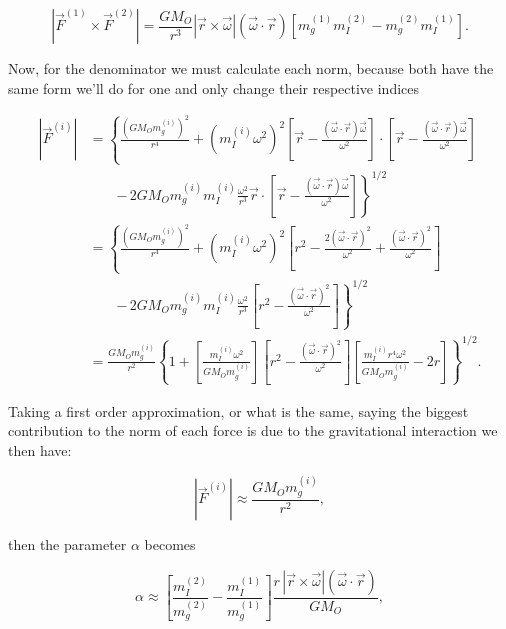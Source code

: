             \begin{equation}
                \left|\Vec{F}^{(1)}\times \Vec{F}^{(2)}\right| = \frac{GM_O}{r^3}|\Vec{r}\times\Vec{\omega}|(\Vec{\omega}\cdot\Vec{r})[m_g^{(1)}m_I^{(2)} - m_g^{(2)}m_I^{(1)}].
            \end{equation}

            Now, for the denominator we must calculate each norm, because both have the same form we'll do for one and only change their respective indices

            \begin{align*}
                |\Vec{F}^{(i)}| &= \left\{\frac{(GM_Om_g^{(i)})^2}{r^4} + (m_I^{(i)}\omega^2)^2 \left[\Vec{r} - \frac{(\Vec{\omega}\cdot\Vec{r})\Vec{\omega}}{\omega^2}\right]\cdot\left[\Vec{r} - \frac{(\Vec{\omega}\cdot\Vec{r})\Vec{\omega}}{\omega^2}\right]\right.\\
                &\qquad\left. -\,2GM_Om_g^{(i)}m_I^{(i)}\frac{\omega^2}{r^3}\Vec{r}\cdot\left[\Vec{r} - \frac{(\Vec{\omega}\cdot\Vec{r})\Vec{\omega}}{\omega^2}\right]\right\}^{1/2}\\
                &=\left\{ \frac{(GM_Om_g^{(i)})^2}{r^4} + (m_I^{(i)}\omega^2)^2\left[r^2 - \frac{2 (\Vec{\omega}\cdot\Vec{r})^2}{\omega^2} + \frac{(\Vec{\omega}\cdot\Vec{r})^2}{\omega^2}\right]\right.\\
                &\qquad\left. -\,2GM_Om_g^{(i)}m_I^{(i)}\frac{\omega^2}{r^3}\left[r^2 - \frac{(\Vec{\omega}\cdot\Vec{r})^2}{\omega^2}\right] \right\}^{1/2}\\
                &=  \frac{GM_Om_g^{(i)}}{r^2}\left\{1 + \left[\frac{m_I^{(i)}\omega^2}{GM_Om_g^{(i)}}\right]\left[r^2 - \frac{(\Vec{\omega}\cdot\Vec{r})^2}{\omega^2}\right]\left[\frac{m_I^{(i)}r^4\omega^2}{GM_Om_g^{(i)}} - 2r\right]\right\}^{1/2}.
            \end{align*}

            Taking a first order approximation, or what is the same, saying the biggest contribution to the norm of each force is due to the gravitational interaction we then have:

            \begin{equation}
                |\Vec{F}^{(i)}| \approx \frac{GM_Om_g^{(i)}}{r^2},
            \end{equation}

            then the parameter $\alpha$ becomes

            \begin{equation}
                \alpha \approx \left[\frac{m_I^{(2)}}{m_g^{(2)}} - \frac{m_I^{(1)}}{m_g^{(1)}} \right] \frac{r\,|\Vec{r}\times\Vec{\omega}|(\Vec{\omega}\cdot\Vec{r})}{GM_O},
            \end{equation}

